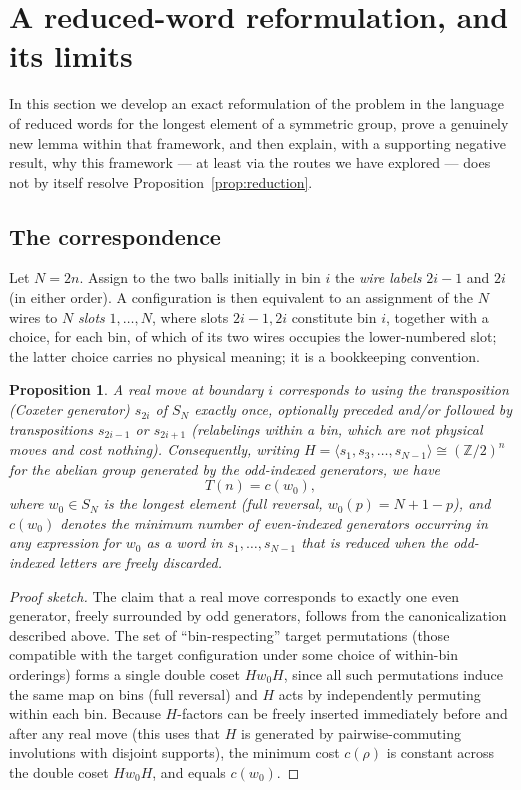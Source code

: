 \documentclass[11pt]{amsart}
\theoremstyle{plain}
\newtheorem{proposition}[theorem]{Proposition}
\theoremstyle{definition}
\theoremstyle{remark}
\begin{document}
\section{A reduced-word reformulation, and its limits}
\label{sec:wiring}

In this section we develop an exact reformulation of the problem in the language of reduced words for the longest element of a symmetric group, prove a genuinely new lemma within that framework, and then explain, with a supporting negative result, why this framework --- at least via the routes we have explored --- does not by itself resolve Proposition~\ref{prop:reduction}.

\subsection{The correspondence}

Let $N=2n$. Assign to the two balls initially in bin $i$ the \emph{wire labels} $2i-1$ and $2i$ (in either order). A configuration is then equivalent to an assignment of the $N$ wires to $N$ \emph{slots} $1,\dots,N$, where slots $2i-1,2i$ constitute bin $i$, together with a choice, for each bin, of which of its two wires occupies the lower-numbered slot; the latter choice carries no physical meaning; it is a bookkeeping convention.

\begin{proposition}
\label{prop:correspondence}
A real move at boundary $i$ corresponds to using the transposition (Coxeter generator) $s_{2i}$ of $S_N$ exactly once, optionally preceded and/or followed by transpositions $s_{2i-1}$ or $s_{2i+1}$ (relabelings within a bin, which are not physical moves and cost nothing). Consequently, writing $H=\langle s_1,s_3,\dots,s_{N-1}\rangle\cong(\mathbb{Z}/2)^n$ for the abelian group generated by the odd-indexed generators, we have
\[
T(n) = c(w_0),
\]
where $w_0\in S_N$ is the longest element (full reversal, $w_0(p)=N+1-p$), and $c(w_0)$ denotes the minimum number of even-indexed generators occurring in any expression for $w_0$ as a word in $s_1,\dots,s_{N-1}$ that is reduced when the odd-indexed letters are freely discarded.
\end{proposition}

\begin{proof}[Proof sketch]
The claim that a real move corresponds to exactly one even generator, freely surrounded by odd generators, follows from the canonicalization described above. The set of ``bin-respecting'' target permutations (those compatible with the target configuration under some choice of within-bin orderings) forms a single double coset $Hw_0H$, since all such permutations induce the same map on bins (full reversal) and $H$ acts by independently permuting within each bin. Because $H$-factors can be freely inserted immediately before and after any real move (this uses that $H$ is generated by pairwise-commuting involutions with disjoint supports), the minimum cost $c(\rho)$ is constant across the double coset $Hw_0H$, and equals $c(w_0)$.
\end{proof}
\end{document}
